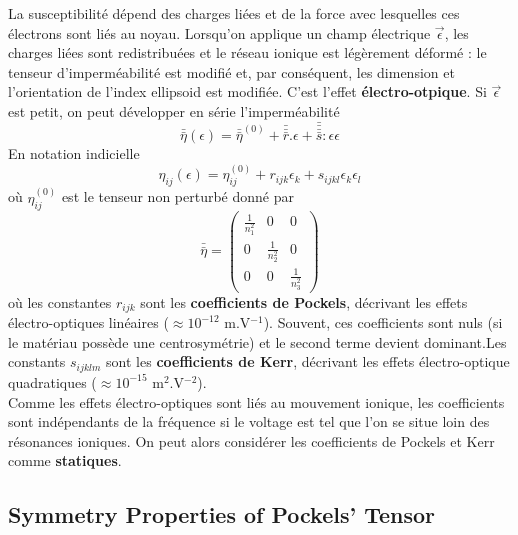 La susceptibilité dépend des charges liées et de la force avec lesquelles ces électrons sont liés au
noyau. Lorsqu'on applique un champ électrique $\vec{\epsilon}$, les charges liées sont redistribuées et
le réseau ionique est légèrement déformé : le tenseur d'imperméabilité est modifié et, par conséquent, 
les dimension et l'orientation de l'index ellipsoid est modifiée. C'est l'effet \textbf{électro-otpique}. Si
$\vec{\epsilon}$ est petit, on peut développer en série l'imperméabilité
\begin{equation}
\bar{\bar{\eta}}(\epsilon) = \bar{\bar{\eta}}^{(0)}+\bar{\bar{\bar{r}}}.\epsilon + \bar{\bar{\bar{\bar{s}}}}:
\epsilon\epsilon
\end{equation}
En notation indicielle
\begin{equation}
\eta_{ij}(\epsilon) = \eta_{ij}^{(0)}+r_{ijk}\epsilon_k+s_{ijkl}\epsilon_k\epsilon_l
\end{equation}
où $\eta_{ij}^{(0)}$ est le tenseur non perturbé donné par
\begin{equation}
\bar{\bar{\eta}} = \left(\begin{array}{ccc}
\frac{1}{n^2_1}&0&0\\
0&\frac{1}{n^2_2}&0\\
0&0&\frac{1}{n^2_3}
\end{array}\right)
\end{equation}
où les constantes $r_{ijk}$ sont les \textbf{coefficients de Pockels}, décrivant les effets électro-optiques
linéaires ($\approx 10^{-12}$ m.V$^{-1}$). Souvent, ces coefficients sont nuls (si le matériau possède une
centrosymétrie) et le second terme devient dominant.Les constants $s_{ijklm}$ sont les \textbf{coefficients
de Kerr}, décrivant les effets électro-optique quadratiques ($\approx 10^{-15}$ m$^2$.V$^{-2}$). \\

Comme les effets électro-optiques sont liés au mouvement ionique, les coefficients sont indépendants de la
fréquence si le voltage est tel que l'on se situe loin des résonances ioniques. On peut alors considérer
les coefficients de Pockels et Kerr comme \textbf{statiques}.

\subsection{Symmetry Properties of Pockels’ Tensor}
